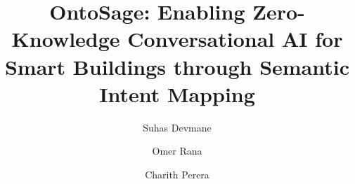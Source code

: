 \documentclass[acmsmall]{acmart}
\begin{document}
\title[OntoSage: Zero-Knowledge Conversational AI for Smart Buildings]{OntoSage: Enabling Zero-Knowledge Conversational AI for Smart Buildings through Semantic Intent Mapping}

\author{Suhas Devmane}

\author{Omer Rana}

\author{Charith Perera}

\renewcommand{\shortauthors}{Devmane et al.}
\end{document}
